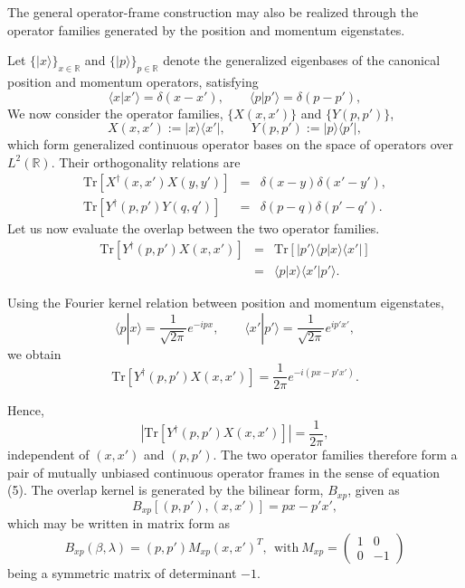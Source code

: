 \documentclass[aps,pra,onecolumn,nofootinbib,superscriptaddress,showpacs]{revtex4}
\begin{document}
\noindent The general operator-frame construction may also be realized
through the operator families generated by the
position and momentum eigenstates.

Let $\{|x\rangle\}_{x\in\mathbb R}$ and
$\{|p\rangle\}_{p\in\mathbb R}$ denote the generalized
eigenbases of the canonical position and momentum operators,
satisfying
\begin{equation}
\langle x|x'\rangle = \delta(x-x'),
\qquad
\langle p|p'\rangle = \delta(p-p'),
\end{equation}
%
We now consider the operator families, $\{X(x,x')\}$ and $\{Y(p,p')\}$,
\begin{equation}
X(x,x') := |x\rangle\langle x'|,
\qquad
Y(p,p') := |p\rangle\langle p'|,
\end{equation}
which form generalized continuous operator bases on the
space of operators over $L^2(\mathbb R)$.
Their orthogonality relations are
\begin{eqnarray}
\mathrm{Tr}
\!\left[
X^\dagger(x,x')
X(y,y')
\right]
&=&
\delta(x-y)\delta(x'-y'),
\\
\mathrm{Tr}
\!\left[
Y^\dagger(p,p')
Y(q,q')
\right]
&=&
\delta(p-q)\delta(p'-q').
\end{eqnarray}
Let us now evaluate the overlap between the two operator
families. 
\begin{eqnarray}
\mathrm{Tr}
\!\left[
Y^\dagger(p,p')
X(x,x')
\right]
&=&
\mathrm{Tr}
\!\left[
|p'\rangle\langle p|
x\rangle\langle x'|
\right]
\\
&=&
\langle p|x\rangle
\langle x'|p'\rangle.
\end{eqnarray}

Using the Fourier kernel relation between position and
momentum eigenstates,
\begin{equation}
\langle p|x\rangle
=
\frac{1}{\sqrt{2\pi}}
e^{-ipx},
\qquad
\langle x'|p'\rangle
=
\frac{1}{\sqrt{2\pi}}
e^{ip'x'},
\end{equation}
we obtain
\begin{equation}
\mathrm{Tr}
\!\left[
Y^\dagger(p,p')
X(x,x')
\right]
=
\frac{1}{2\pi}
e^{-i(px-p'x')}.
\end{equation}

Hence,
\begin{equation}
\left|
\mathrm{Tr}
\!\left[
Y^\dagger(p,p')
X(x,x')
\right]
\right|
=
\frac{1}{2\pi},
\end{equation}
independent of $(x,x')$ and $(p,p')$.
The two operator families therefore form a pair of mutually
unbiased continuous operator frames in the sense of
equation (5).
The overlap kernel is generated by the bilinear form, $B_{xp}$, given as
\begin{equation}
B_{xp}\!\left[
(p,p'),(x,x')
\right]
=
px-p'x',
\end{equation}
which may be written in matrix form as
\begin{equation}
B_{xp}(\beta,\lambda)
=
(p,p') M_{xp} (x,x')^T,~~
\text{with} ~M_{xp} =
\begin{pmatrix}
1 & 0 \\
0 & -1
\end{pmatrix}
\end{equation}
being a symmetric matrix of determinant $-1$.
\end{document}
